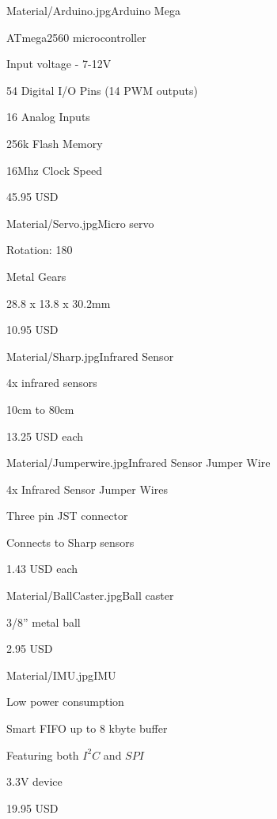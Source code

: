 \begin{material}{Material/Arduino.jpg}{Arduino Mega}
\item ATmega2560 microcontroller
\item Input voltage - 7-12V
\item 54 Digital I/O Pins (14 PWM outputs)
\item 16 Analog Inputs
\item 256k Flash Memory
\item 16Mhz Clock Speed
\item 45.95 USD
\end{material}

\begin{material}{Material/Servo.jpg}{Micro servo}
\item Rotation: 180\degree
\item Metal Gears
\item 28.8 x 13.8 x 30.2mm
\item 10.95 USD
\end{material}

\newpage
{}
\begin{material}{Material/Sharp.jpg}{Infrared Sensor}
\item 4x infrared sensors
\item 10cm to 80cm
\item 13.25 USD each
\end{material}

\begin{material}{Material/Jumperwire.jpg}{Infrared Sensor Jumper Wire}
\item 4x Infrared Sensor Jumper Wires
\item Three pin JST connector
\item Connects to Sharp sensors
\item 1.43 USD each
\end{material}

\begin{material}{Material/BallCaster.jpg}{Ball caster}
\item 3/8'' metal ball
\item 2.95 USD
\end{material}

\newpage
{}
\begin{material}{Material/IMU.jpg}{IMU}
\item Low power consumption
\item Smart FIFO up to 8 kbyte buffer
\item Featuring both $I^2C$ and $SPI$
\item 3.3V device
\item 19.95 USD
\end{material}

